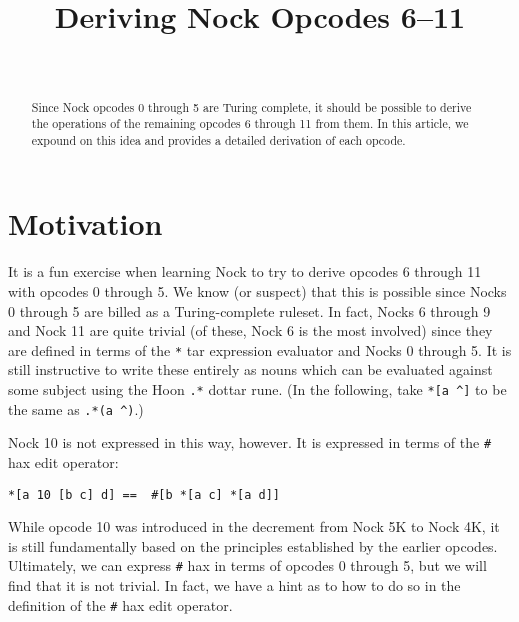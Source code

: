 \documentclass[twoside]{article}
\title{Deriving Nock Opcodes 6–11}
\author{\authorname~\authorpatp}
\date{}
\begin{document}
\maketitle
\thispagestyle{firststyle}

\begin{abstract}
  Since Nock opcodes 0 through 5 are Turing complete, it should be possible to derive the operations of the remaining opcodes 6 through 11 from them.  In this article, we expound on this idea and provides a detailed derivation of each opcode.
\end{abstract}

\setcounter{page}{46}

\tableofcontents

\section{Motivation}

It is a fun exercise when learning Nock to try to derive opcodes 6 through 11 with opcodes 0 through 5. We know (or suspect) that this is possible since Nocks 0 through 5 are billed as a Turing-complete ruleset. In fact, Nocks 6 through 9 and Nock 11 are quite trivial (of these, Nock 6 is the most involved) since they are defined in terms of the \lstinline[style=inlinecode]{*} tar expression evaluator and Nocks 0 through 5. It is still instructive to write these entirely as nouns which can be evaluated against some subject using the Hoon \lstinline[style=inlinecode]{.*} dottar rune. (In the following, take \lstinline[style=inlinecode]{*[a ^]} to be the same as \lstinline[style=inlinecode]{.*(a ^)}.)

Nock 10 is not expressed in this way, however. It is expressed in terms of the \lstinline[style=inlinecode]{#} hax edit operator:

\begin{lstlisting}[style=listingcode]
*[a 10 [b c] d] ==  #[b *[a c] *[a d]]
\end{lstlisting}

\noindent
While opcode 10 was introduced in the decrement from Nock 5K to Nock 4K, it is still fundamentally based on the principles established by the earlier opcodes.  Ultimately, we can express \lstinline[style=inlinecode]{#} hax in terms of opcodes 0 through 5, but we will find that it is not trivial. In fact, we have a hint as to how to do so in the definition of the \lstinline[style=inlinecode]{#} hax edit operator.
\end{document}
